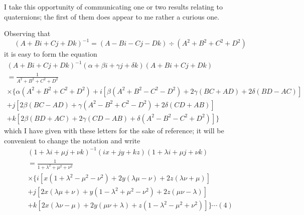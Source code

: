 \documentclass[12pt,a4paper]{article}
\begin{document}
I take this opportunity of communicating one or two results relating to quaternions;
the first of them does appear to me rather a curious one.

Observing that
\[
(A + Bi + Cj + Dk)^{-1} = (A - Bi - Cj - Dk) \div (A^2 + B^2 + C^2 + D^2)
\]
it is easy to form the equation
\begin{multline*}
(A + Bi + Cj + Dk)^{-1} (\alpha + \beta i + \gamma j + \delta k) (A + Bi + Cj + Dk)\\
= \frac{1}{A^2 + B^2 + C^2 + D^2}\\
\times \{\alpha(A^2+B^2+C^2+D^2) + i[\beta(A^2+B^2-C^2-D^2) + 2\gamma(BC+AD) + 2\delta(BD-AC)]\\
+ j[2\beta(BC-AD) + \gamma(A^2-B^2+C^2-D^2) + 2\delta(CD+AB)]\\
+ k[2\beta(BD+AC) + 2\gamma(CD-AB) + \delta(A^2-B^2-C^2+D^2)]\}
\end{multline*}
which I have given with these letters for the sake of reference; it will be convenient
to change the notation and write
\begin{multline*}
(1 + \lambda i + \mu j + \nu k)^{-1} (ix + jy + kz) (1 + \lambda i + \mu j + \nu k)\\
= \frac{1}{1 + \lambda^2 + \mu^2 + \nu^2}\\
\times \{i[x(1+\lambda^2-\mu^2-\nu^2) + 2y(\lambda\mu-\nu) + 2z(\lambda\nu+\mu)]\\
+ j[2x(\lambda\mu+\nu) + y(1-\lambda^2+\mu^2-\nu^2) + 2z(\mu\nu-\lambda)]\\
+ k[2x(\lambda\nu-\mu) + 2y(\mu\nu+\lambda) + z(1-\lambda^2-\mu^2+\nu^2)]\} \cdots (4)
\end{multline*}

\newpage
\setcounter{page}{124}
\end{document}
